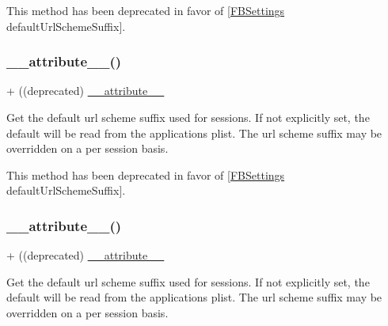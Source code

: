 This method has been deprecated in favor of \mbox{[}\hyperlink{interfaceFBSettings}{F\+B\+Settings} default\+Url\+Scheme\+Suffix\mbox{]}. \mbox{\label{interfaceFBSession_aab7b90337909b905920a4067b5253c2b}} 
\subsubsection{\texorpdfstring{\+\_\+\+\_\+attribute\+\_\+\+\_\+()}{\_\_attribute\_\_()}\hspace{0.1cm}{\footnotesize\ttfamily [18/25]}}
{\footnotesize\ttfamily + ((deprecated) \hyperlink{struct____attribute____}{\+\_\+\+\_\+attribute\+\_\+\+\_\+} \begin{DoxyParamCaption}{ }\end{DoxyParamCaption}}

Get the default url scheme suffix used for sessions. If not explicitly set, the default will be read from the application\textquotesingle{}s plist. The url scheme suffix may be overridden on a per session basis.

This method has been deprecated in favor of \mbox{[}\hyperlink{interfaceFBSettings}{F\+B\+Settings} default\+Url\+Scheme\+Suffix\mbox{]}. \mbox{\label{interfaceFBSession_aab7b90337909b905920a4067b5253c2b}} 
\subsubsection{\texorpdfstring{\+\_\+\+\_\+attribute\+\_\+\+\_\+()}{\_\_attribute\_\_()}\hspace{0.1cm}{\footnotesize\ttfamily [19/25]}}
{\footnotesize\ttfamily + ((deprecated) \hyperlink{struct____attribute____}{\+\_\+\+\_\+attribute\+\_\+\+\_\+} \begin{DoxyParamCaption}{ }\end{DoxyParamCaption}}

Get the default url scheme suffix used for sessions. If not explicitly set, the default will be read from the application\textquotesingle{}s plist. The url scheme suffix may be overridden on a per session basis.

